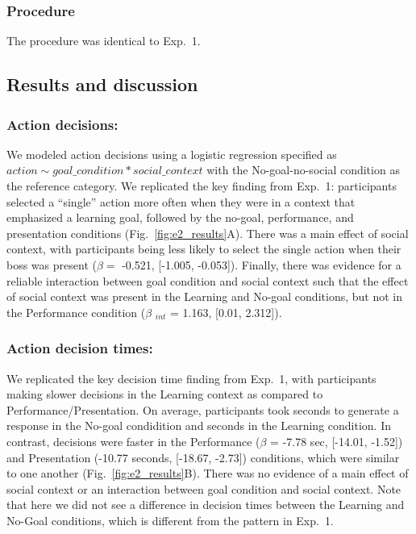 \documentclass[10pt, letterpaper]{article}
\begin{document}
\subsubsection{Procedure}\label{procedure-1}

The procedure was identical to Exp.~1.

\subsection{Results and discussion}\label{results-and-discussion-1}

\subsubsection{Action decisions:}\label{action-decisions-1}

We modeled action decisions using a logistic regression specified as
\texttt{$action \sim goal\_condition * social\_context$} with the
No-goal-no-social condition as the reference category. We replicated the
key finding from Exp.~1: participants selected a ``single'' action more
often when they were in a context that emphasized a learning goal,
followed by the no-goal, performance, and presentation conditions
(Fig.~\ref{fig:e2_results}A). There was a main effect of social context,
with participants being less likely to select the single action when
their boss was present (\(\beta =\) -0.521, {[}-1.005, -0.053{]}).
Finally, there was evidence for a reliable interaction between goal
condition and social context such that the effect of social context was
present in the Learning and No-goal conditions, but not in the
Performance condition (\(\beta\) \(_{int}\) = 1.163, {[}0.01, 2.312{]}).

\subsubsection{Action decision times:}\label{action-decision-times-1}

We replicated the key decision time finding from Exp.~1, with
participants making slower decisions in the Learning context as compared
to Performance/Presentation. On average, participants took seconds to
generate a response in the No-goal condidition and seconds in the
Learning condition. In contrast, decisions were faster in the
Performance (\(\beta\) = -7.78 sec, {[}-14.01, -1.52{]}) and
Presentation (-10.77 seconds, {[}-18.67, -2.73{]}) conditions, which
were similar to one another (Fig.~\ref{fig:e2_results}B). There was no
evidence of a main effect of social context or an interaction between
goal condition and social context. Note that here we did not see a
difference in decision times between the Learning and No-Goal
conditions, which is different from the pattern in Exp.~1.
\end{document}

